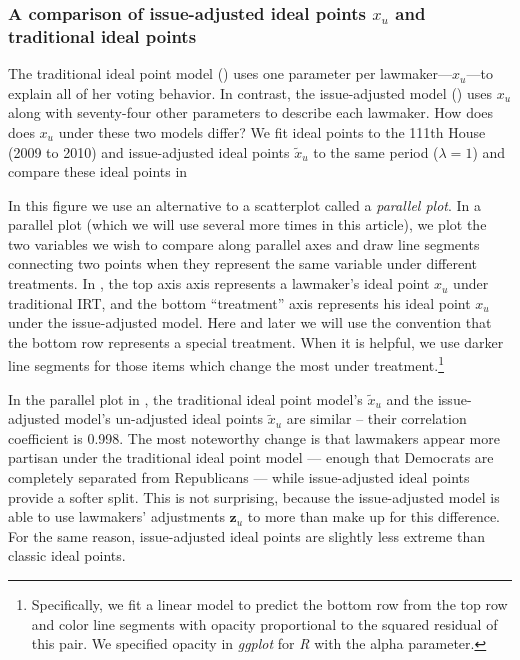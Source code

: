 \subsubsection{A comparison of issue-adjusted ideal points $x_u$ and traditional ideal points}
The traditional ideal point model () uses one parameter
per lawmaker---$x_u$---to explain all of her voting behavior.  In
contrast, the issue-adjusted model () uses
$x_u$ along with seventy-four other parameters to describe each
lawmaker.  How does does $x_u$ under these two models differ?  We fit
ideal points to the 111th House (2009 to 2010) and issue-adjusted
ideal points $\tilde x_u$ to the same period ($\lambda=1$) and compare
these ideal points in 

In this figure we use an alternative to a scatterplot called a
\emph{parallel plot}.  In a parallel plot (which we will use several
more times in this article), we plot the two variables we wish to
compare along parallel axes and draw line segments connecting two
points when they represent the same variable under different
treatments.  In , the top axis axis
represents a lawmaker's ideal point $x_u$ under traditional IRT, and
the bottom ``treatment'' axis represents his ideal point $x_u$ under
the issue-adjusted model.  Here and later we will use the convention
that the bottom row represents a special treatment. When it is
helpful, we use darker line segments for those items which change
the most under treatment.\footnote{Specifically, we fit a linear model
  to predict the bottom row from the top row and color line segments
  with opacity proportional to the squared residual of this pair. We
  specified opacity in \emph{ggplot} for \emph{R} with the alpha
  parameter.}

In the parallel plot in , the traditional
ideal point model's $\tilde x_u$ and the issue-adjusted model's un-adjusted ideal
points $\tilde x_u$ are similar -- their correlation coefficient is
0.998. The most noteworthy change is that lawmakers appear more
partisan under the traditional ideal point model --- enough that
Democrats are completely separated from Republicans --- while
issue-adjusted ideal points provide a softer split.  This is not
surprising, because the issue-adjusted model is able to use lawmakers'
adjustments $\bm z_u$ to more than make up for this difference.  For
the same reason, issue-adjusted ideal points are slightly less extreme
than classic ideal points.

